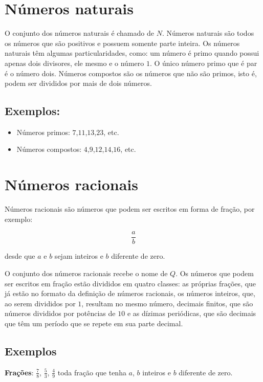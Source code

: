\section{Números naturais}

O conjunto dos números naturais é chamado de $N$. Números naturais são
todos os números que são positivos e possuem somente parte inteira. Os
números naturais têm algumas particularidades, como: um número é primo
quando possui apenas dois divisores, ele mesmo e o número $1$. O único
número primo que é par é o número dois. Números compostos são os números
que não são primos, isto é, podem ser divididos por mais de dois
números.

\subsection{Exemplos:}

\begin{itemize}
\item Números primos: $7$,$11$,$13$,$23$, etc.
\item Números compostos: $4$,$9$,$12$,$14$,$16$, etc.
\end{itemize}

\section{Números racionais}

Números racionais são números que podem ser escritos em forma de fração,
por exemplo:

$$\frac{a}{b}$$

desde que $a$ e $b$ sejam inteiros e $b$ diferente de zero.

O conjunto dos números racionais recebe o nome de $Q$. Os números que
podem ser escritos em fração estão divididos em quatro classes: as
próprias frações, que já estão no formato da definição de números
racionais, os números inteiros, que, ao serem divididos por $1$, resultam
no mesmo número, decimais finitos, que são números divididos por
potências de $10$ e as dízimas periódicas, que são decimais que têm um
período que se repete em sua parte decimal.

\subsection{Exemplos}

\textbf{Frações}: $\frac{7}{8}$, $\frac{5}{3}$, $\frac{4}{9}$ toda fração que tenha $a$,
$b$ inteiros e $b$ diferente de zero.

